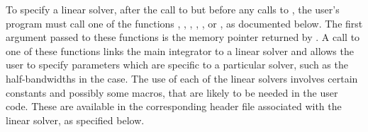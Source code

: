To specify a {\cvode} linear solver, after the call to 
but before any calls to , the user's program must call one
of the functions , , , ,
, or , as documented below.
The first argument passed to these functions is the {\cvode}
memory pointer returned by .  A call to one of these
functions links the main {\cvode} integrator to a linear solver and
allows the user to specify parameters which are specific to a
particular solver, such as the half-bandwidths in the {\cvband} case.
The use of each of the linear solvers involves certain constants and possibly 
some macros, that are likely to be needed in the user code.  These are
available in the corresponding header file associated with the linear
solver, as specified below.

